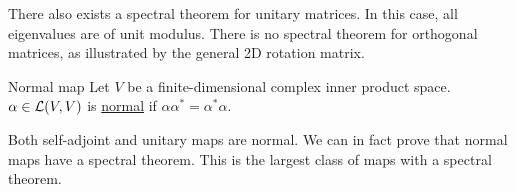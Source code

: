 \documentclass[../Main.tex]{subfiles}
\begin{document}
There also exists a spectral theorem for unitary matrices. In this case, all eigenvalues are of unit modulus. There is no spectral theorem for orthogonal matrices, as illustrated by the general 2D rotation matrix.
\begin{definition}{Normal map}
    Let $V$ be a finite-dimensional complex inner product space. $\alpha \in \mathcal{L}(V,V)$ is \underline{normal} if $\alpha\alpha^* = \alpha^*\alpha$.
\end{definition}
Both self-adjoint and unitary maps are normal. We can in fact prove that normal maps have a spectral theorem. This is the largest class of maps with a spectral theorem.
\end{document}

